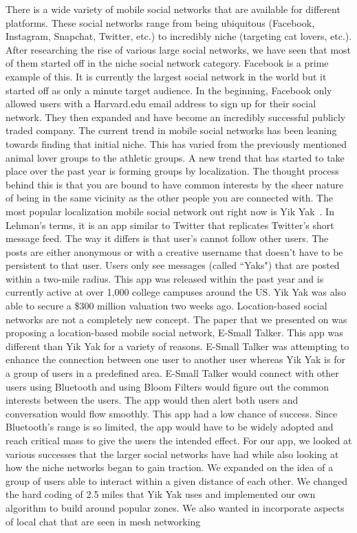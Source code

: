 There is a wide variety of mobile social networks that are available for different platforms. These social networks range from being ubiquitous (Facebook, Instagram, Snapchat, Twitter, etc.) to incredibly niche (targeting cat lovers, etc.). After researching the rise of various large social networks, we have seen that most of them started off in the niche social network category. Facebook is a prime example of this. It is currently the largest social network in the world but it started off as only a minute target audience. In the beginning, Facebook only allowed users with a Harvard.edu email address to sign up for their social network. They then expanded and have become an incredibly successful publicly traded company.
The current trend in mobile social networks has been leaning towards finding that initial niche. This has varied from the previously mentioned animal lover groups to the athletic groups. A new trend that has started to take place over the past year is forming groups by localization. The thought process behind this is that you are bound to have common interests by the sheer nature of being in the same vicinity as the other people you are connected with. The most popular localization mobile social network out right now is Yik Yak~\cite{YikYak}. In Lehman's terms, it is an app similar to Twitter that replicates Twitter's short message feed. The way it differs is that user's cannot follow other users. The posts are either anonymous or with a creative username that doesn't have to be persistent to that user. Users only see messages (called ``Yaks") that are posted within a two-mile radius. This app was released within the past year and is currently active at over 1,000 college campuses around the US. Yik Yak was also able to secure a \$300 million valuation two weeks ago. 
Location-based social networks are not a completely new concept. The paper that we presented on was proposing a location-based mobile social network, E-Small Talker. This app was different than Yik Yak for a variety of reasons. E-Small Talker was attempting to enhance the connection between one user to another user whereas Yik Yak is for a group of users in a predefined area. E-Small Talker would connect with other users using Bluetooth and using Bloom Filters would figure out the common interests between the users. The app would then alert both users and conversation would flow smoothly. This app had a low chance of success. Since Bluetooth's range is so limited, the app would have to be widely adopted and reach critical mass to give the users the intended effect.
For our app, we looked at various successes that the larger social networks have had while also looking at how the niche networks began to gain traction. We expanded on the idea of a group of users able to interact within a given distance of each other. We changed the hard coding of 2.5 miles that Yik Yak uses and implemented our own algorithm to build around popular zones.   We also wanted in incorporate aspects of local chat that are seen in mesh networking~\cite{raniwala2005architecture}